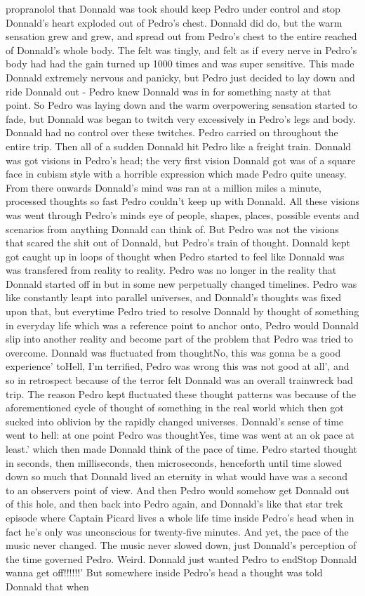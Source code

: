 \documentclass[12pt]{book}
\begin{document}
propranolol that Donnald was took should keep Pedro under control and stop Donnald's heart exploded out of Pedro's chest. Donnald did do, but the warm sensation grew and grew, and spread out from Pedro's chest to the entire reached of Donnald's whole body. The felt was tingly, and felt as if every nerve in Pedro's body had had the gain turned up 1000 times and was super sensitive. This made Donnald extremely nervous and panicky, but Pedro just decided to lay down and ride Donnald out - Pedro knew Donnald was in for something nasty at that point. So Pedro was laying down and the warm overpowering sensation started to fade, but Donnald was began to twitch very excessively in Pedro's legs and body. Donnald had no control over these twitches. Pedro carried on throughout the entire trip. Then all of a sudden Donnald hit Pedro like a freight train. Donnald was got visions in Pedro's head; the very first vision Donnald got was of a square face in cubism style with a horrible expression which made Pedro quite uneasy. From there onwards Donnald's mind was ran at a million miles a minute, processed thoughts so fast Pedro couldn't keep up with Donnald. All these visions was went through Pedro's minds eye of people, shapes, places, possible events and scenarios from anything Donnald can think of. But Pedro was not the visions that scared the shit out of Donnald, but Pedro's train of thought. Donnald kept got caught up in loops of thought when Pedro started to feel like Donnald was was transfered from reality to reality. Pedro was no longer in the reality that Donnald started off in but in some new perpetually changed timelines. Pedro was like constantly leapt into parallel universes, and Donnald's thoughts was fixed upon that, but everytime Pedro tried to resolve Donnald by thought of something in everyday life which was a reference point to anchor onto, Pedro would Donnald slip into another reality and become part of the problem that Pedro was tried to overcome. Donnald was fluctuated from thoughtNo, this was gonna be a good experience' toHell, I'm terrified, Pedro was wrong this was not good at all', and so in retrospect because of the terror felt Donnald was an overall trainwreck bad trip. The reason Pedro kept fluctuated these thought patterns was because of the aforementioned cycle of thought of something in the real world which then got sucked into oblivion by the rapidly changed universes. Donnald's sense of time went to hell: at one point Pedro was thoughtYes, time was went at an ok pace at least.' which then made Donnald think of the pace of time. Pedro started thought in seconds, then milliseconds, then microseconds, henceforth until time slowed down so much that Donnald lived an eternity in what would have was a second to an observers point of view. And then Pedro would somehow get Donnald out of this hole, and then back into Pedro again, and Donnald's like that star trek episode where Captain Picard lives a whole life time inside Pedro's head when in fact he's only was unconscious for twenty-five minutes. And yet, the pace of the music never changed. The music never slowed down, just Donnald's perception of the time governed Pedro. Weird. Donnald just wanted Pedro to endStop Donnald wanna get off!!!!!!' But somewhere inside Pedro's head a thought was told Donnald that when 
\end{document}
